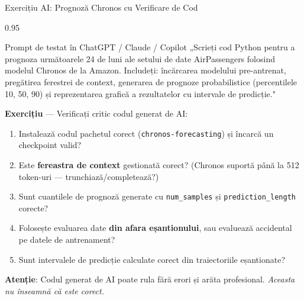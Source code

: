 \documentclass[9pt, aspectratio=169, t]{beamer}
\begin{document}
\begin{frame}{Exercițiu AI: Prognoză Chronos cu Verificare de Cod}
    \begin{cminipage}{0.95\textwidth}
    \vspace{-0.3cm}
    \begin{block}{\footnotesize Prompt de testat în ChatGPT / Claude / Copilot}
        {\scriptsize
        „Scrieți cod Python pentru a prognoza următoarele 24 de luni ale setului de date AirPassengers folosind modelul Chronos de la Amazon. Includeți: încărcarea modelului pre-antrenat, pregătirea ferestrei de context, generarea de prognoze probabilistice (percentilele 10, 50, 90) și reprezentarea grafică a rezultatelor cu intervale de predicție."
        }
    \end{block}
    \vspace{-3mm}
    {\scriptsize
    \textbf{Exercițiu} --- Verificați critic codul generat de AI:
    \begin{enumerate}\setlength{\itemsep}{0pt}
        \item Instalează codul pachetul corect (\texttt{chronos-forecasting}) și încarcă un checkpoint valid?
        \item Este \textbf{fereastra de context} gestionată corect? (Chronos suportă până la 512 token-uri --- trunchiază/completează?)
        \item Sunt cuantilele de prognoză generate cu \texttt{num\_samples} și \texttt{prediction\_length} corecte?
        \item Folosește evaluarea date \textbf{din afara eșantionului}, sau evaluează accidental pe datele de antrenament?
        \item Sunt intervalele de predicție calculate corect din traiectoriile eșantionate?
    \end{enumerate}
    }
    \vspace{-3mm}
    \begin{alertblock}{}
        {\footnotesize \textbf{Atenție}: Codul generat de AI poate rula fără erori și arăta profesional. \textit{Aceasta nu înseamnă că este corect.}}
    \end{alertblock}
    \end{cminipage}
\end{frame}

\end{document}
